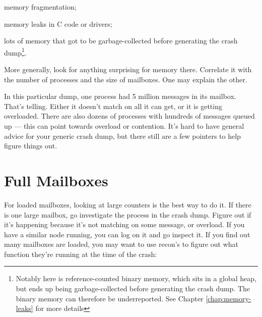 \documentclass[11pt, oneside]{book}   	%
\begin{document}
\begin{itemize*}
	\item memory fragmentation;
	\item memory leaks in C code or drivers;
	\item lots of memory that got to be garbage-collected before generating the crash dump\footnote{Notably here is reference-counted binary memory, which sits in a global heap, but ends up being garbage-collected before generating the crash dump. The binary memory can therefore be underreported. See Chapter \ref{chap:memory-leaks} for more details}.
\end{itemize*}

More generally, look for anything surprising for memory there. Correlate it with the number of processes and the size of mailboxes. One may explain the other. 

In this particular dump, one process had 5 million messages in its mailbox. That's telling. Either it doesn't match on all it can get, or it is getting overloaded. There are also dozens of processes with hundreds of messages queued up — this can point towards overload or contention. It's hard to have general advice for your generic crash dump, but there still are a few pointers to help figure things out.

\section{Full Mailboxes}
\label{sec:crash-full-mailboxes}

For loaded mailboxes, looking at large counters is the best way to do it. If there is one large mailbox, go investigate the process in the crash dump. Figure out if it's happening because it's not matching on some message, or overload. If you have a similar node running, you can log on it and go inspect it. If you find out many mailboxes are loaded, you may want to use recon's  to figure out what function they're running at the time of the crash:

\end{document}
